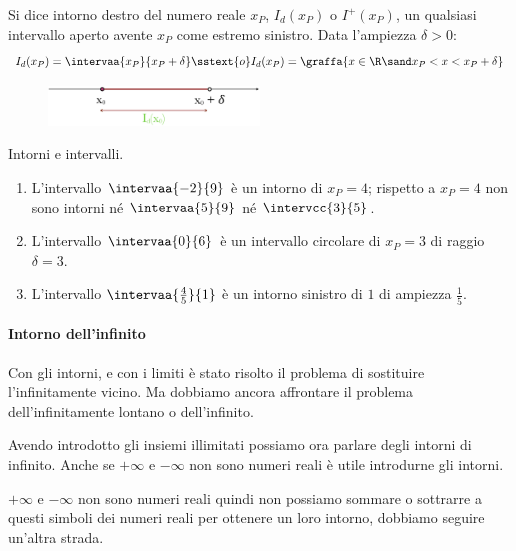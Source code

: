 \begin{newdef}{}{}
Si dice intorno destro del numero reale \(x_P\), \(I_d(x_P)\) o 
\(I^+(x_P)\), un qualsiasi intervallo aperto avente \(x_P\) come estremo 
sinistro. 
Data l'ampiezza \(\delta > 0\):
\[I_d(x_P) = \intervaa{x_P}{x_P+\delta} \sstext{o} 
  I_d(x_P) = \graffa{x \in \R \sand x_P < x < x_P+\delta}\]
\end{newdef}

\begin{figure}[h!]
\centering
\includegraphics[width=0.5\textwidth]{img/top_4a.png}%
\end{figure}

\begin{esempio} Intorni e intervalli.
\begin{enumerate}[label=\alph*)]
\item L'intervallo \(\intervaa{-2}{9}\) è un intorno di \(x_P=4\); rispetto 
a 
\(x_P=4\) non sono intorni né \(\intervaa{5}{9}\) né \(\intervcc{3}{5}\).
\item L'intervallo \(\intervaa{0}{6}\) è un intervallo circolare di 
\(x_P=3\) 
di raggio \(\delta=3\).
\item L'intervallo \(\intervaa{\frac{4}{5}}{1}\) è un intorno sinistro di 
\(1\) di ampiezza \(\frac{1}{5}\). 
\end{enumerate}
\end{esempio}

\paragraph{Intorno dell'infinito}

Con gli intorni, e con i limiti è stato risolto il problema di sostituire 
l'infinitamente vicino.
Ma dobbiamo ancora affrontare il problema dell'infinitamente lontano o 
dell'infinito.

Avendo introdotto gli insiemi illimitati possiamo ora parlare degli intorni 
di infinito. Anche se 
\(+\infty\) e \(-\infty\) non sono numeri reali è utile 
introdurne gli intorni.

\(+\infty\) e \(-\infty\) non sono numeri reali quindi non possiamo sommare 
o sottrarre a questi simboli dei numeri reali per ottenere un loro intorno, 
dobbiamo seguire un'altra strada.


